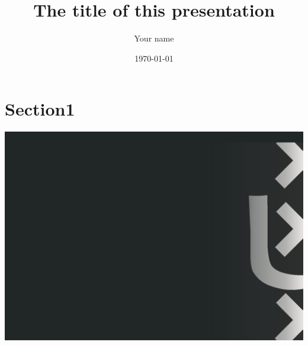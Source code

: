 \documentclass[compress]{beamer}
\title[Title shown in the bar]{The title of this presentation} %
\subtitle{} %
\author[Your email]{Your name}
\institute[Informatics Institute]{University of Amsterdam}
\date[{\today}]\today
\begin{document}

\frame[plain]{\titlepage} %


\section{Section1} %

{
    \includegraphics[width=\paperwidth,height=\paperheight]{UvA-bg.png}
}
\end{document}
